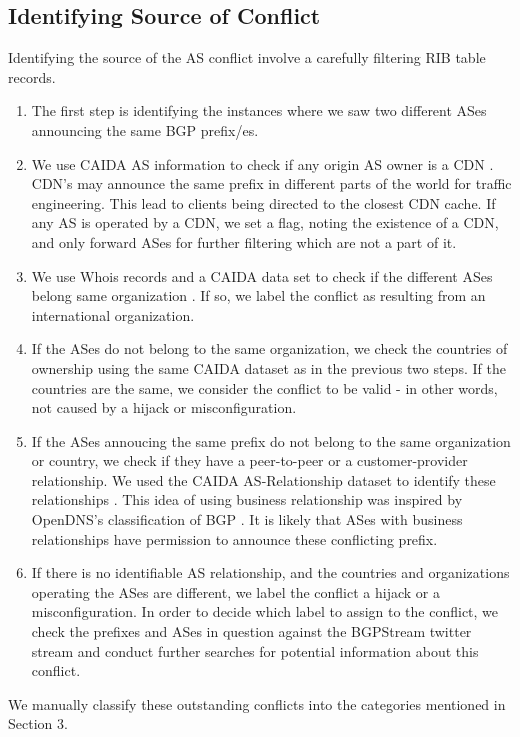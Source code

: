 \subsection{Identifying Source of Conflict}
Identifying the source of the AS conflict involve a carefully filtering RIB table records. 
\begin{enumerate}
\item The first step is identifying the instances where we saw two different ASes announcing the same BGP prefix/es.
\item We use CAIDA AS information to check if any origin AS owner is a CDN \cite{mapping}. CDN's may announce the same prefix in different parts of the world for traffic engineering. This lead to clients being directed to the closest CDN cache. If any AS is operated by a CDN, we set a flag, noting the existence of a CDN, and only forward ASes for further filtering which are not a part of it. 
\item We use Whois records and a CAIDA data set  to check if the different ASes belong same organization  \cite{mapping}. If so, we label the conflict as resulting from an international organization.
\item If the ASes do not belong to the same organization, we check the countries of ownership using the same CAIDA dataset as in the previous two steps. If the countries are the same, we consider the conflict to be valid - in other words, not caused by a hijack or misconfiguration.
\item If the ASes annoucing the same prefix do not belong to the same organization or country, we check if they have a peer-to-peer or a customer-provider relationship. We used the CAIDA AS-Relationship dataset to identify these relationships \cite{relation}. This idea of using business relationship was inspired by OpenDNS's classification of BGP \cite{opendns_blackhat_2015}. It is likely that ASes with business relationships have permission to announce these conflicting prefix. 
\item If there is no identifiable AS relationship, and the countries and organizations operating the ASes are different, we label the conflict a hijack or a misconfiguration. In order to decide which label to assign to the conflict, we check the prefixes and ASes in question against the BGPStream twitter stream and conduct further searches for potential information about this conflict.
\end{enumerate}

We manually classify these outstanding conflicts into the categories mentioned in Section 3.

